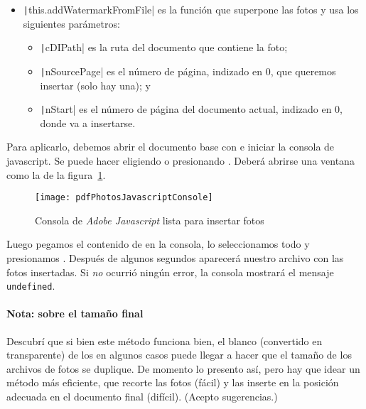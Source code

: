 \documentclass[%
	a5paper,
	10pt,
	twoside,
	openright,
	final,
]{memoir}
\begin{document}
{	\begin{itemize}[noitemsep]
		\item \texttt|this.addWatermarkFromFile| es la función que superpone las fotos y usa los siguientes parámetros:
		\begin{itemize}[noitemsep]
			\item \texttt|cDIPath| es la ruta del documento que contiene la foto;
			\item \texttt|nSourcePage| es el número de página, indizado en 0, que queremos insertar (solo hay una); y
			\item \texttt|nStart| es el número de página del documento actual, indizado en 0, donde va a insertarse.
		\end{itemize}
	\end{itemize}


	Para aplicarlo, debemos abrir el documento base  con \acrobat e iniciar la consola de javascript. Se puede hacer eligiendo  o presionando . Deberá abrirse una ventana como la de la figura~\ref{fig:pdfPhotosJavascriptConsole}.

	\begin{figure}
		\texttt{[image: pdfPhotosJavascriptConsole]}
		\caption{Consola de \emph{Adobe Javascript} lista para insertar fotos\label{fig:pdfPhotosJavascriptConsole}}
	\end{figure}

	Luego pegamos el contenido de  en la consola, lo seleccionamos todo y presionamos \keys{\ctrl + \return}. Después de algunos segundos aparecerá nuestro archivo  con las fotos insertadas. Si \emph{no} ocurrió ningún error, la consola mostrará el mensaje \texttt{undefined}.

	\paragraph{Nota: sobre el tamaño final} Descubrí que si bien este método funciona bien, el blanco (convertido en transparente) de los \jpeg en algunos casos puede llegar a hacer que el tamaño de los archivos de fotos se duplique. De momento lo presento así, pero hay que idear un método más eficiente, que recorte las fotos (fácil) y las inserte en la posición adecuada en el documento final (difícil). (Acepto sugerencias.)

}
\end{document}
